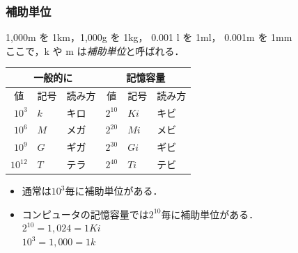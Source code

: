 \documentclass[handout]{beamer}        %
\begin{document}
\begin{frame}
  \frametitle{補助単位}
  1,000m を 1km，1,000g を 1kg， 0.001 l を 1ml， 0.001m を 1mm\\
  ここで，k や m は\emph{補助単位}と呼ばれる．\\

  \begin{center}
    {\small\begin{tabular}{r l l | r l l}\hline\hline
      \multicolumn{3}{c|}{一般的に} &
      \multicolumn{3}{c}{記憶容量} \\
      \hline
      \multicolumn{1}{c}{値} &
      \multicolumn{1}{c}{記号} &
      \multicolumn{1}{c|}{読み方} &
      \multicolumn{1}{c}{値} &
      \multicolumn{1}{c}{記号} &
      \multicolumn{1}{c}{読み方} \\
      \hline
      $10^3$   & $k$ & キロ   & $2^{10}$ & $Ki$ & キビ \\
      $10^6$   & $M$ & メガ   & $2^{20}$ & $Mi$ & メビ \\
      $10^9$   & $G$ & ギガ   & $2^{30}$ & $Gi$ & ギビ \\
      $10^{12}$& $T$ & テラ   & $2^{40}$ & $Ti$ & テビ \\
    \end{tabular}}
  \end{center}

  \begin{itemize}
  \item 通常は$10^3$毎に補助単位がある．
  \item コンピュータの記憶容量では$2^{10}$毎に補助単位がある．\\
    $2^{10} = 1,024 = 1Ki$ \\
    $10^3   = 1,000 = 1k$
  \end{itemize}
\end{frame}
\end{document}
